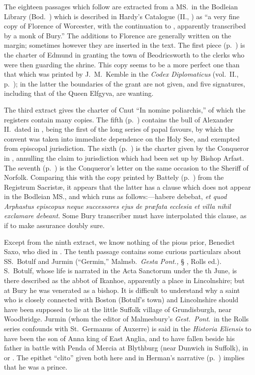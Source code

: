 \documentclass[10pt]{book}
\begin{document}
{The eighteen passages which follow are extracted from a MS.\ in the Bodleian Library (Bod.\ ) which is described in Hardy's Catalogue (II., ) as ``a very fine copy of Florence of Worcester, with the continuation to , apparently transcribed by a monk of Bury.'' The additions to Florence are generally written on the margin; sometimes however they are inserted in the text. The first piece (p.\ ) is the charter of Edmund in  granting the town of Beodricsworth to the clerks who were then guarding the shrine. This copy seems to be a more perfect one than that which was printed by J.\ M.\ Kemble in the \emph{Codex Diplomaticus} (vol.\ II., p.\ ); in the latter the boundaries of the grant are not given, and five signatures, including that of the Queen Elfgyva, are wanting.

The third extract gives the charter of Cnut ``In nomine poliarchis,'' of which the registers contain many copies. The fifth (p.\ ) contains the bull of Alexander II.\ dated in , being the first of the long series of papal favours, by which the convent was taken into immediate dependence on the Holy See, and exempted from episcopal jurisdiction. The sixth (p.\ ) is the charter given by the Conqueror in , annulling the claim to jurisdiction which had been set up by Bishop Arfast. The seventh (p.\ ) is the Conqueror's letter on the same occasion to the Sheriff of Norfolk. Comparing this with the copy printed by Battely (p.\ ) from the Registrum Sacrist\ae{}, it appears that the latter has a clause which does not appear in the Bodleian MS., and which runs as follows:---habere debebat, \emph{et quod Arphastus episcopus neque successores ejus de pr\ae{}fata ecclesia et villa nihil exclamare debeant.} Some Bury transcriber must have interpolated this clause, as if to make assurance doubly sure.

Except from the ninth extract, we know nothing of the pious prior, Benedict Saxo, who died in . The tenth passage contains some curious particulars about SS.\ Botulf and Jurmin (``Germin,'' Malmsb.\ \emph{Gesta Pont.,} § , Rolls ed.). S.\ Botulf, whose life is narrated in the Acta Sanctorum under the th June, is there described as the abbot of Ikanhoe, apparently a place in Lincolnshire; but at Bury he was venerated as a bishop. It is difficult to understand why a saint who is closely connected with Boston (Botulf's town) and Lincolnshire should have been supposed to lie at the little Suffolk village of Grundisburgh, near Woodbridge. Jurmin (whom the editor of Malmesbury's \emph{Gest.\ Pont}.\ in the Rolls series confounds with St.\ Germanus of Auxerre) is said in the \emph{Historia Eliensis} to have been the son of Anna king of East Anglia, and to have fallen beside his father in battle with Penda of Mercia at Blythburg (near Dunwich in Suffolk), in  or . The epithet ``clito'' given both here and in Herman's narrative (p.\ ) implies that he was a prince.

}
\end{document}
